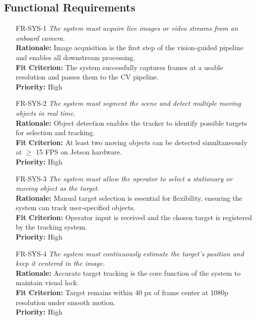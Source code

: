 \documentclass[12pt]{article}
\begin{document}
\subsection{Functional Requirements}

\begin{itemize}

  \item[FR-SYS-1] \emph{The system must acquire live images or video streams from an onboard camera.}\\[2mm]
    {\bf Rationale:} Image acquisition is the first step of the vision-guided pipeline and enables all downstream processing.\\
    {\bf Fit Criterion:} The system successfully captures frames at a usable resolution and passes them to the CV pipeline.\\
    {\bf Priority:} High

  \item[FR-SYS-2] \emph{The system must segment the scene and detect multiple moving objects in real time.}\\[2mm]
    {\bf Rationale:} Object detection enables the tracker to identify possible targets for selection and tracking.\\
    {\bf Fit Criterion:} At least two moving objects can be detected simultaneously at $\geq$ 15 FPS on Jetson hardware.\\
    {\bf Priority:} High

  \item[FR-SYS-3] \emph{The system must allow the operator to select a stationary or moving object as the target.}\\[2mm]
    {\bf Rationale:} Manual target selection is essential for flexibility, ensuring the system can track user-specified objects.\\
    {\bf Fit Criterion:} Operator input is received and the chosen target is registered by the tracking system.\\
    {\bf Priority:} High

  \item[FR-SYS-4] \emph{The system must continuously estimate the target’s position and keep it centered in the image.}\\[2mm]
    {\bf Rationale:} Accurate target tracking is the core function of the system to maintain visual lock.\\
    {\bf Fit Criterion:} Target remains within 40 px of frame center at 1080p resolution under smooth motion.\\
    {\bf Priority:} High


\end{itemize}
\end{document}

